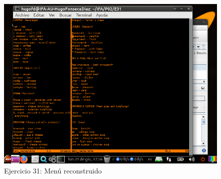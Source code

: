 \documentclass[11pt]{article}
\begin{document}
\begin{figure}[H]
    \caption{Ejercicio 31: Menú reconstruido}
  \centering
  \includegraphics[scale=0.7]{e31-7.png}
\end{figure}



\begin{thebibliography}{8}
\end{thebibliography}
\end{document}
